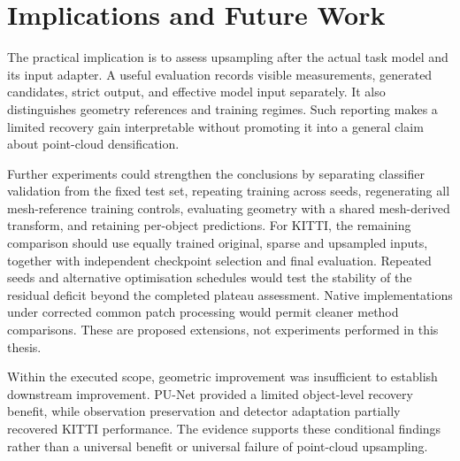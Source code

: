 \section{Implications and Future Work}

The practical implication is to assess upsampling after the actual task
model and its input adapter. A useful evaluation records visible
measurements, generated candidates, strict output, and effective model
input separately. It also distinguishes geometry references and training
regimes. Such reporting makes a limited recovery gain interpretable
without promoting it into a general claim about point-cloud densification.

Further experiments could strengthen the conclusions by separating
classifier validation from the fixed test set, repeating training across
seeds, regenerating all mesh-reference training controls, evaluating
geometry with a shared mesh-derived transform, and retaining
per-object predictions. For KITTI, the remaining comparison should use
equally trained original, sparse and upsampled inputs, together with
independent checkpoint selection and final evaluation. Repeated seeds
and alternative optimisation schedules would test the stability of the
residual deficit beyond the completed plateau assessment. Native implementations
under corrected common patch processing would permit cleaner method
comparisons. These are proposed extensions, not experiments performed in
this thesis.

Within the executed scope, geometric improvement was insufficient to
establish downstream improvement. PU-Net provided a limited object-level
recovery benefit, while observation preservation and detector adaptation
partially recovered KITTI performance. The evidence supports these
conditional findings rather than a universal benefit or universal failure
of point-cloud upsampling.
